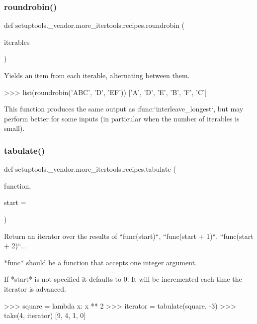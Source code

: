\subsubsection{\texorpdfstring{roundrobin()}{roundrobin()}}
{\footnotesize\ttfamily def setuptools.\+\_\+vendor.\+more\+\_\+itertools.\+recipes.\+roundrobin (\begin{DoxyParamCaption}\item[{}]{iterables }\end{DoxyParamCaption})}

\begin{DoxyVerb}Yields an item from each iterable, alternating between them.

    >>> list(roundrobin('ABC', 'D', 'EF'))
    ['A', 'D', 'E', 'B', 'F', 'C']

This function produces the same output as :func:`interleave_longest`, but
may perform better for some inputs (in particular when the number of
iterables is small).\end{DoxyVerb}
 \mbox{\label{namespacesetuptools_1_1__vendor_1_1more__itertools_1_1recipes_a5e469586263264b5ca8a6d1d71849cea}} 
\subsubsection{\texorpdfstring{tabulate()}{tabulate()}}
{\footnotesize\ttfamily def setuptools.\+\_\+vendor.\+more\+\_\+itertools.\+recipes.\+tabulate (\begin{DoxyParamCaption}\item[{}]{function,  }\item[{}]{start = {} }\end{DoxyParamCaption})}

\begin{DoxyVerb}Return an iterator over the results of ``func(start)``,
``func(start + 1)``, ``func(start + 2)``...

*func* should be a function that accepts one integer argument.

If *start* is not specified it defaults to 0. It will be incremented each
time the iterator is advanced.

    >>> square = lambda x: x ** 2
    >>> iterator = tabulate(square, -3)
    >>> take(4, iterator)
    [9, 4, 1, 0]\end{DoxyVerb}
 \mbox{\label{namespacesetuptools_1_1__vendor_1_1more__itertools_1_1recipes_acd82f149b51f4e643e24fc9478ca9363}} 
